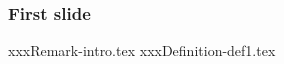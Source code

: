 \documentclass{beamer}
\begin{document}
\begin{frame}
  \frametitle{First slide}
   {xxxRemark-intro.tex}
   {xxxDefinition-def1.tex}
\end{frame}
\end{document}
